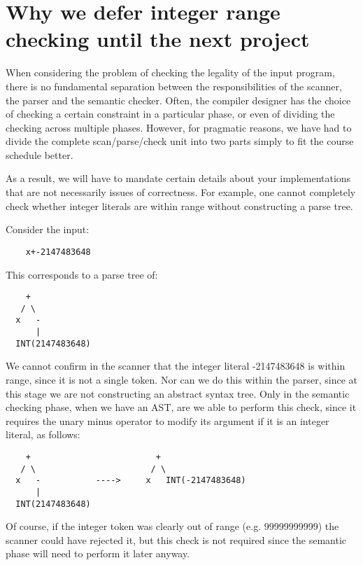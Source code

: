 \newpage
\appendix
\section{Why we defer integer range checking until the next project}

When considering the problem of checking the legality of the input
program, there is no fundamental separation between the
responsibilities of the scanner, the parser and the semantic checker.
Often, the compiler designer has the choice of checking a certain
constraint in a particular phase, or even of dividing the checking
across multiple phases.  However, for pragmatic reasons, we have had
to divide the complete scan/parse/check unit into two parts simply to
fit the course schedule better.

As a result, we will have to mandate certain details about your
implementations that are not necessarily issues of correctness.  For
example, one cannot completely check whether integer literals are
within range without constructing a parse tree.

Consider the input:

\begin{verbatim}
    x+-2147483648
\end{verbatim}

This corresponds to a parse tree of:

\begin{verbatim}
    +
   / \
  x   -
      |
  INT(2147483648)
\end{verbatim}

We cannot confirm in the scanner that the integer literal -2147483648
is within range, since it is not a single token.  Nor can we do this
within the parser, since at this stage we are not constructing an
abstract syntax tree.  Only in the semantic checking phase, when we
have an AST, are we able to perform this check, since it requires the
unary minus operator to modify its argument if it is an integer
literal, as follows:

\begin{verbatim}
    +                         +
   / \                       / \
  x   -           ---->     x   INT(-2147483648)
      |
  INT(2147483648)
\end{verbatim}

Of course, if the integer token was clearly out of range
(e.g. 99999999999) the scanner could have rejected it, but this check
is not required since the semantic phase will need to perform it later
anyway.

